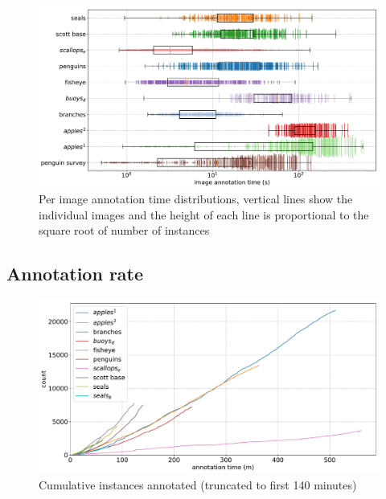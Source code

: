 \begin{figure}[ht]
\centering
\includegraphics[width=1.0\linewidth]{charts/summaries/duration_boxplot.pdf}
\caption{ Per image annotation time distributions, vertical lines show the individual images and the height of each line is proportional to the square root of number of instances }
\label{fig:duration_boxplot}
\end{figure}




\subsection{Annotation rate}

\begin{figure}[H]
\centering
\includegraphics[width=1.0\linewidth]{charts/summaries/cumulative_instances.pdf}
\caption{ Cumulative instances annotated (truncated to first 140 minutes)  }
\label{fig:cumulative_instances}
\end{figure}



